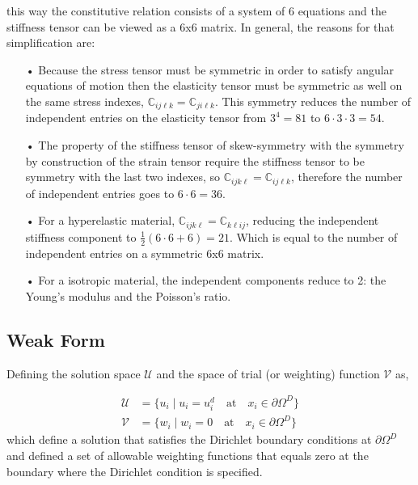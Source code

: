 \documentclass[11pt, a4paper]{article}
\numberwithin{equation}{section}
\begin{document}
this way the constitutive relation consists of a system of 6 equations and the stiffness tensor can be viewed as a 6x6 matrix. In general, the reasons for that simplification are:
\begin{itemize}
\item[•] Because the stress tensor must be symmetric in order to satisfy angular equations of motion then the elasticity tensor must be symmetric as well on the same stress indexes, $\mathbb{C}_{ij\ell k} = \mathbb{C}_{ji\ell k}$. This symmetry reduces the number of independent entries on the elasticity tensor from $3^4 = 81$ to $6\cdot3\cdot3=54$.
\item[•] The property of the stiffness tensor of skew-symmetry with the symmetry by construction of the strain tensor require the stiffness tensor to be symmetry with the last two indexes, so $\mathbb{C}_{ij k\ell} = \mathbb{C}_{ij\ell k}$, therefore the number of independent entries goes to $6 \cdot 6 = 36$.
\item[•] For a hyperelastic material,  $\mathbb{C}_{ijk\ell}=\mathbb{C}_{k\ell ij }  $, reducing the independent stiffness component to $\frac{1}{2}(6 \cdot6+6)=21$. Which is equal to the number of independent entries on a symmetric 6x6 matrix.
\item[•] For a isotropic material, the independent components reduce to 2: the Young's modulus and the Poisson's ratio.
\end{itemize} 


\subsection{Weak Form}

Defining the solution space $\mathcal{U}$ and the space of trial (or weighting) function $\mathcal{V} $ as,

\begin{align*}
\mathcal{U} &= \{ u_i \;|\; u_i= u_i^d \quad \text{at} \quad x_i \in \partial \Omega^D \} \\
\mathcal{V} &= \{ w_i \;|\; w_i = 0 \quad \text{at} \quad x_i \in \partial \Omega^D \}
\end{align*}
which define a solution that satisfies the Dirichlet boundary conditions at $\partial \Omega^D$ and defined a set of allowable weighting functions that equals zero at the boundary where the Dirichlet condition is specified.
\end{document}
